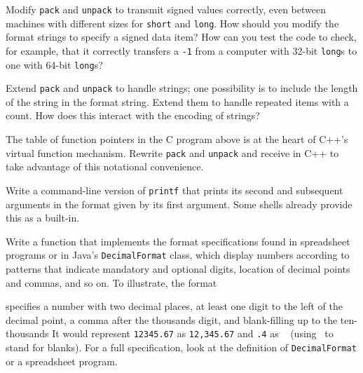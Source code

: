 \begin{exercise}
    Modify \verb'pack' and \verb'unpack' to transmit signed values
    correctly, even between machines with different sizes for \verb'short'
    and \verb'long'. How should you modify the format strings to specify a
    signed data item? How can you test the code to check, for example, that
    it correctly transfers a \verb'-1' from a computer with 32-bit
    \verb'long's to one with 64-bit \verb'long's?
\end{exercise}
\begin{exercise}
    Extend \verb'pack' and \verb'unpack' to handle strings; one possibility
    is to include the length of the string in the format string. Extend
    them to handle repeated items with a count. How does this interact with
    the encoding of strings?
\end{exercise}
\begin{exercise}
    The table of function pointers in the C program above is at the heart
    of C++'s virtual function mechanism. Rewrite \verb'pack' and
    \verb'unpack' and receive in C++ to take advantage of this notational
    convenience.
\end{exercise}
\begin{exercise}
    Write a command-line version of \verb'printf' that prints its second
    and subsequent arguments in the format given by its first argument.
    Some shells already provide this as a built-in.
\end{exercise}
\begin{exercise}
    Write a function that implements the format specifications found in
    spreadsheet programs or in Java's \verb'DecimalFormat' class, which
    display numbers according to patterns that indicate mandatory and
    optional digits, location of decimal points and commas, and so on. To
    illustrate, the format
    specifies a number with two decimal places, at least one digit to the
    left of the decimal point, a comma after the thousands digit, and
    blank-filling up to the ten-thousands It would represent
    \verb'12345.67' as \verb'12,345.67' and \verb'.4' as
    \texttt{\textvisiblespace\textvisiblespace
        \textvisiblespace{}} (using \textvisiblespace 
    \ to stand for blanks). For a full specification, look at the definition
    of \verb'DecimalFormat' or a spreadsheet program.
\end{exercise}

